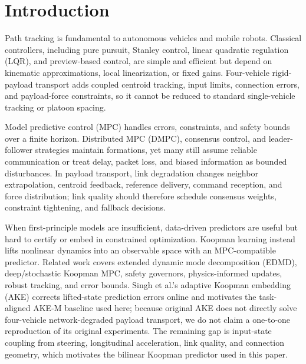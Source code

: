 \documentclass[twocolumn,3p,times,procedia]{elsarticle}
\begin{document}
\section{Introduction}

Path tracking is fundamental to autonomous vehicles and mobile robots. Classical controllers, including pure pursuit, Stanley control, linear quadratic regulation (LQR), and preview-based control, are simple and efficient but depend on kinematic approximations, local linearization, or fixed gains. Four-vehicle rigid-payload transport adds coupled centroid tracking, input limits, connection errors, and payload-force constraints, so it cannot be reduced to standard single-vehicle tracking or platoon spacing.

Model predictive control (MPC) handles errors, constraints, and safety bounds over a finite horizon. Distributed MPC (DMPC), consensus control, and leader-follower strategies maintain formations, yet many still assume reliable communication or treat delay, packet loss, and biased information as bounded disturbances. In payload transport, link degradation changes neighbor extrapolation, centroid feedback, reference delivery, command reception, and force distribution; link quality should therefore schedule consensus weights, constraint tightening, and fallback decisions.

When first-principle models are insufficient, data-driven predictors are useful but hard to certify or embed in constrained optimization. Koopman learning instead lifts nonlinear dynamics into an observable space with an MPC-compatible predictor\cite{brunton2016koopmanControl,korda2018koopmanMpc,xiao2022deepKoopmanVehicle,joglekar2023koopmanExperimental}. Related work covers extended dynamic mode decomposition (EDMD), deep/stochastic Koopman MPC, safety governors, physics-informed updates, robust tracking, and error bounds\cite{kim2025ksmpc,chen2024koopmanSafetyGovernor,wang2026deepKoopmanRobustTracking,zhang2025physicsInformedAdaptiveKoopman,chen2024esoDeepKoopman,philipp2023koopmanErrorBounds,cibulka2021koopmanVehicleMpc}. Singh et al.'s adaptive Koopman embedding (AKE) corrects lifted-state prediction errors online and motivates the task-aligned AKE-M baseline used here\cite{singh2025adaptiveKoopman}; because original AKE does not directly solve four-vehicle network-degraded payload transport, we do not claim a one-to-one reproduction of its original experiments. The remaining gap is input-state coupling from steering, longitudinal acceleration, link quality, and connection geometry, which motivates the bilinear Koopman predictor used in this paper.
\end{document}
